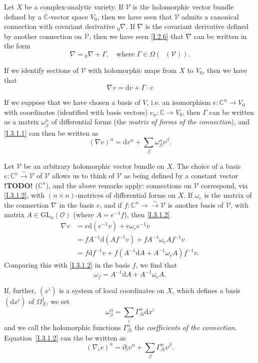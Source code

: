 \documentclass{report}
\theoremstyle{plain}
\theoremstyle{definition}
\newenvironment{env}[1]
    {\renewcommand\theinnercustomenv{#1}\innercustomenv}
    {\endinnercustomenv}
\newcommand{\sh}{\mathscr}
\newcommand{\CC}{\mathbb{C}}
\newcommand{\dd}{\mathrm{d}}
\newcommand{\GL}{\mathrm{GL}}
\DeclareMathOperator{\shEnd}{\underline{End}}
\newcommand{\todo}{\textbf{ !TODO! }}
\newcommand{\oldpage}[1]{\marginpar{\footnotesize$\Big\vert$ \textit{p.~#1}}}
\begin{document}
\begin{env}{3.1}
\label{I.3.1}
  Let $X$ be a complex-analytic variety.
  If $\sh{V}$ is the holomorphic vector bundle defined by a $\CC$-vector space $V_0$, then we have seen that $\sh{V}$ admits a canonical connection with covariant derivative ${}_0\!\nabla$.
  If $\nabla$ is the covariant derivative defined by another connection on $\sh{V}$, then we have seen \cref{I.2.6} that $\nabla$ can be written in the form
  \[
    \nabla = {}_0\!\nabla + \Gamma,
    \quad\mbox{where $\Gamma\in\Omega(\shEnd(\sh{V}))$.}
  \]

  If we identify sections of $\sh{V}$ with holomorphic maps from $X$ to $V_0$, then we have that
  \[
  \label{I.3.1.1}
    \nabla v = \dd v + \Gamma\cdot v
  \tag{3.1.1}
  \]

  If we suppose that we have chosen a basis of $V$, i.e. an isomorphism $e\colon\CC^n\to V_0$ with coordinates (identified with basis vectors) $e_\alpha\colon\CC\to V_0$, then $\Gamma$ can be written as a matrix $\omega_\beta^\alpha$ of differential forms (the \emph{matrix of forms of the connection}), and \cref{I.3.1.1} can then be written as
  \[
  \label{I.3.1.2}
    (\nabla v)^\alpha = \dd v^\alpha + \sum_\beta \omega_\beta^\alpha v^\beta.
  \tag{3.1.2}
  \]

  Let $\sh{V}$ be an arbitrary holomorphic vector bundle on $X$.
  The choice of a basis $e\colon\CC^n\xrightarrow{\sim}\sh{V}$ of $\sh{V}$ allows us to think of $\sh{V}$ as being defined by a
\oldpage{22}
  constant vector \todo ($\CC^n$), and the above remarks apply:
  connections on $\sh{V}$ correspond, via \cref{I.3.1.2}, with $(n\times n)$-matrices of differential forms on $X$.
  If $\omega_e$ is the matrix of the connection $\nabla$ in the basis $e$, and if $f\colon\CC^n\to\xrightarrow{\sim}\sh{V}$ is another basis of $\sh{V}$, with matrix $A\in\GL_n(\sh{O})$ (where $A=e^{-1}f$), then \cref{I.3.1.2}
  \[
    \begin{aligned}
      \nabla v
      &= e\dd(e^{-1}v) + e\omega_e e^{-1}v
    \\&= fA^{-1}\dd(Af^{-1}v) + fA^{-1}\omega_e Af^{-1}v
    \\&= f\dd f^{-1}v + f(A^{-1}\dd A + A^{-1}\omega_e A)f^{-1}v.
    \end{aligned}
  \]
  Comparing this with \cref{I.3.1.2} in the basis $f$, we find that
  \[
  \label{I.3.1.3}
    \omega_f = A^{-1}\dd A + A^{-1}\omega_e A.
  \tag{3.1.3}
  \]

  If, further, $(x^i)$ is a system of local coordinates on $X$, which defines a basis $(\dd x^i)$ of $\Omega_X^1$, we set
  \[
    \omega_\beta^\alpha = \sum_i \Gamma_{\beta i}^\alpha \dd x^i
  \]
  and we call the holomorphic functions $\Gamma_{\beta i}^\alpha$ the \emph{coefficients of the connection}.
  Equation~\cref{I.3.1.2} can the be written as
  \[
  \label{I.3.1.4}
    (\nabla_i v)^\alpha = \partial_i v^\alpha + \sum_\beta \Gamma_{\beta i}^\alpha v^\beta.
  \tag{3.1.4}
  \]


\end{env}
\end{document}
